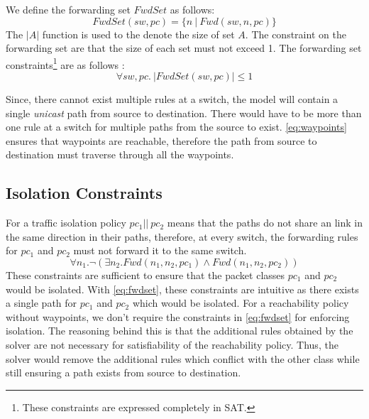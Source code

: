 We define the forwarding set $FwdSet$ as follows:
\begin{equation}
	FwdSet(sw,pc) = \{n \ | \ Fwd(sw,n,pc)\}
\end{equation}
The $|A|$ function is used to the denote the size of set $A$. The constraint on the forwarding set are that the size of each set must not exceed 1. The forwarding set constraints\footnote{
	These constraints are expressed completely in SAT.} are as follows : 
\begin{equation}
		\forall sw,pc . \ |FwdSet(sw,pc)| \leq 1 \label{eq:fwdset}
\end{equation}

Since, there cannot exist multiple rules at a switch, the model will contain a 
single {\em unicast} path from source to destination. There would have to 
be more than one rule at a switch for multiple paths from the source to exist. 
\cref{eq:waypoints} ensures that waypoints are reachable, therefore
 the path from source to destination must traverse through all the waypoints. 

\subsection{Isolation Constraints}
For a traffic isolation policy $pc_1 || \ pc_2$ means that the paths do not share an link in the same direction in their paths, therefore, at every switch, the forwarding rules for $pc_1$ and $pc_2$ must not forward it to the same switch.  
\begin{equation}
	\forall n_1. \neg ( \exists n_2. Fwd(n_1,n_2,pc_1) \wedge Fwd(n_1,n_2,pc_2)) \label{eq:isolation}
\end{equation}
These constraints are sufficient to ensure that the packet classes $pc_1$ and $pc_2$ would be isolated. 
With \cref{eq:fwdset}, these constraints are intuitive as there exists a single path for $pc_1$ and
$pc_2$ which would be isolated. For a reachability policy without waypoints, we 
don't require the constraints in \cref{eq:fwdset} for enforcing isolation. The reasoning 
behind this is that the additional rules obtained by the solver are not necessary for satisfiability of the 
reachability policy. Thus, the solver would remove the additional rules which conflict with
the other class while still ensuring a path exists from source to destination. 

